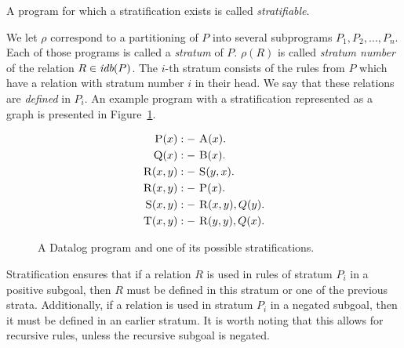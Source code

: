 A program for which a stratification exists is called \emph{stratifiable}. 


We let $\rho$ correspond to a partitioning of $P$ into several subprograms $P_1, P_2, \dots, P_n$. Each of those programs is called a \emph{stratum} of $P$. $\rho(R)$ is called \emph{stratum number} of the relation $R \in \textit{idb}(P )$. The $i$-th stratum consists of the rules from $P$ which have a relation with stratum number $i$ in their head. We say that these relations are \emph{defined} in $P_i$. An example program with a stratification represented as a graph is presented in Figure~\ref{fig:precedgraph}.

\begin{figure}[!htbp]
\begin{minipage}{0.5\linewidth}
\begin{align*}
\textsc{P}(x) &:-~ \textsc{A}(x).\\
\textsc{Q}(x) &:-~ \textsc{B}(x).\\
\textsc{R}(x, y) &:-~ \textsc{S}(y, x).\\
\textsc{R}(x, y) &:-~ \textsc{P}(x).\\
\textsc{S}(x, y) &:-~ \textsc{R}(x, y), Q(y).\\
\textsc{T}(x, y) &:-~ \textsc{R}(y, y), Q(x).\\
\end{align*}
\end{minipage}%
\begin{minipage}{0.5\linewidth}

\end{minipage}%
\caption{A Datalog program and one of its possible stratifications.}\label{fig:precedgraph}
\end{figure}

Stratification ensures that if a relation $R$ is used in rules of stratum $P_i$ in a positive subgoal, then $R$ must be defined in this stratum or one of the previous strata. Additionally, if a relation is used in stratum $P_i$ in a negated subgoal, then it must be defined in an earlier stratum. It is worth noting that this allows for recursive rules, unless the recursive subgoal is negated.


